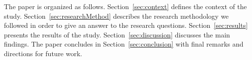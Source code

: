 %





The paper is organized as follows. Section~\ref{sec:context} defines the context of the study. 
Section~\ref{sec:researchMethod} describes the research methodology we followed in order to give an answer to the research questions.
Section~\ref{sec:results} presents the results of the study. Section~\ref{sec:discussion} discusses the main findings.  
The paper concludes in Section~\ref{sec:conclusion} with final remarks and directions for future work.

